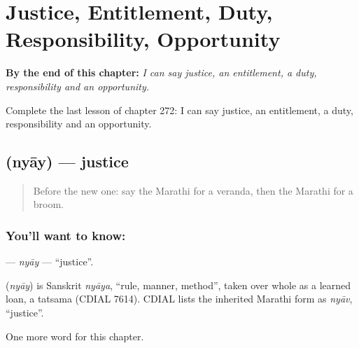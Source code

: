 
\chapter{Justice, Entitlement, Duty, Responsibility, Opportunity}
\label{ch:mr-justice-entitlement-duty-responsibility-opportunity}

\begin{chapteropening}
\textbf{By the end of this chapter:} \emph{I can say justice, an entitlement, a duty, responsibility and an opportunity.}

Complete the last lesson of chapter 272: I can say justice, an entitlement, a duty, responsibility and an opportunity.
\end{chapteropening}

\section[\texorpdfstring{\mr{न्याय} (nyāy)}{न्याय (nyāy)}]{ (nyāy) — justice}

\label{lesson:MR-C272-nyay}



\begin{quote}
Before the new one: say the Marathi for a veranda, then the Marathi for a broom.
\end{quote}

\subsection*{You'll want to know: }
\textbf{} — \emph{nyāy} — \textquotedblleft{}justice\textquotedblright{}.

\begin{cousinweb}
\textbf{} (\emph{nyāy}) is Sanskrit \emph{nyāya}, \textquotedblleft{}rule, manner, method\textquotedblright{}, taken over whole as a learned loan, a tatsama (CDIAL 7614). CDIAL lists the inherited Marathi form as \emph{nyāv}, \textquotedblleft{}justice\textquotedblright{}.
\end{cousinweb}

\begin{grammarlens}[title={What you've built}]
One more word for this chapter.
\end{grammarlens}

